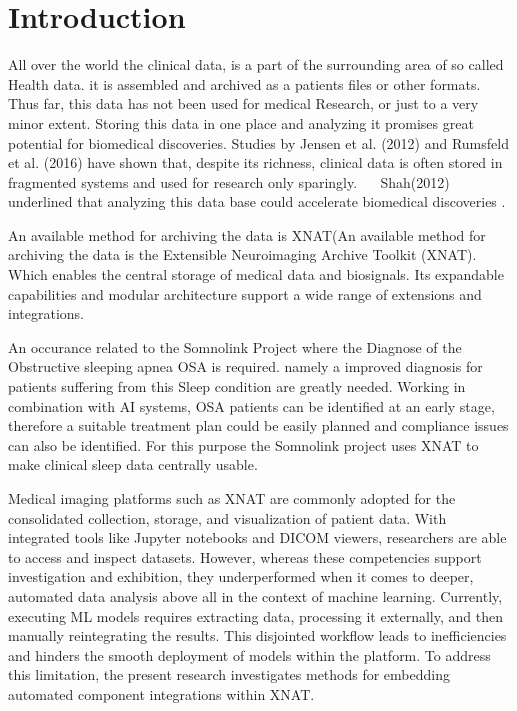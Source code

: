 
\chapter{Introduction}
\begin{comment}
...
\end{comment}

 All over the world the clinical data, is a part of the surrounding area of so called Health data. it is assembled and archived as a patients files or other formats. Thus far, this data has not been used for medical Research, or just to a very minor extent. Storing this data in one place and analyzing it promises great potential for biomedical discoveries. Studies by Jensen et al. (2012) and Rumsfeld et al. (2016) have shown that, despite its richness, clinical data is often stored in fragmented systems and used for research only sparingly.~\cite{jensen_mining_2012} ~\cite{rumsfeld_big_2016} Shah(2012) underlined that analyzing this data base could accelerate biomedical discoveries \cite{shah_coming_2012}.


An available method for archiving the data is XNAT(An available method for archiving the data is the Extensible Neuroimaging Archive Toolkit (XNAT). ~\cite{marcus_extensible_2007} Which enables the central storage of medical data and biosignals. Its expandable capabilities and modular architecture support a wide range of extensions and integrations. 


An occurance related to the Somnolink Project where the Diagnose of the Obstructive sleeping apnea \ac{OSA} is required. namely a improved diagnosis for patients suffering from this Sleep condition are greatly needed. Working in combination with \ac{AI} systems, OSA patients can be identified at an early stage, therefore a suitable treatment plan could be easily planned and compliance issues can also be identified. For this purpose the Somnolink project uses XNAT to make clinical sleep data centrally usable.~\cite{internetredaktion_somnolink_nodate}   


Medical imaging platforms such as XNAT are commonly adopted for the consolidated collection, storage, and visualization of patient data. With integrated tools like Jupyter notebooks and \ac{DICOM} viewers, researchers are able to access and inspect datasets. However, whereas these competencies support investigation and exhibition, they underperformed when it comes to deeper, automated data analysis above all in the context of machine learning. Currently, executing ML models requires extracting data, processing it externally, and then manually reintegrating the results. This disjointed workflow leads to inefficiencies and hinders the smooth deployment of models within the platform. To address this limitation, the present research investigates methods for embedding automated component integrations within XNAT.


